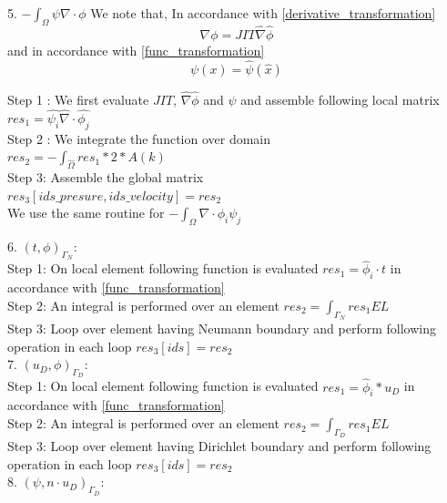 \documentclass[a4paper,10pt]{book}
\begin{document}
5. $-\int_{\Omega} \psi \nabla \cdot \phi$
We note that, In accordance with \ref{derivative_transformation}\begin{equation}
\nabla \phi = JIT \hat{\nabla} \hat{\phi}
\end{equation}
and in accordance with \ref{func_transformation}
\begin{equation}
\psi(x) = \hat{\psi} (\hat{x})
\end{equation}

Step 1 : We first evaluate $JIT$, $\hat{\nabla} \hat{\phi}$ and $\psi$ and assemble following local matrix\\
$res_1 = \hat{\psi_i} \hat{\nabla} \cdot \hat{\phi_j}$\\

Step 2 : We integrate the function over domain\\
$res_2 = -\int_{\hat{\Omega}} res_1 * 2 * A(k)$\\

Step 3: Assemble the global matrix\\
$res_3[ids\_presure,ids\_velocity] = res_2$\\

We use the same routine for $-\int_{\Omega} \nabla \cdot \phi_i \psi_j $

6. $(t,\phi)_{\Gamma_N}$:
\\

Step 1: On local element following function is evaluated $res_1=\hat{\phi}_i \cdot t$ in accordance with \ref{func_transformation}\\
Step 2: An integral is performed over an element $res_2=\int_{\Gamma_N} res_1 EL $\\
Step 3: Loop over element having Neumann boundary and perform following operation in each loop $res_3[ids]=res_2$\\

7. $(u_D,\phi)_{\Gamma_D}$:
\\

Step 1: On local element following function is evaluated $res_1=\hat{\phi}_i*u_D$ in accordance with \ref{func_transformation}\\
Step 2: An integral is performed over an element $res_2=\int_{\Gamma_D} res_1 EL $\\
Step 3: Loop over element having Dirichlet boundary and perform following operation in each loop $res_3[ids]=res_2$\\

8. $(\psi, n \cdot u_D)_{\Gamma_D} $:
\end{document}
